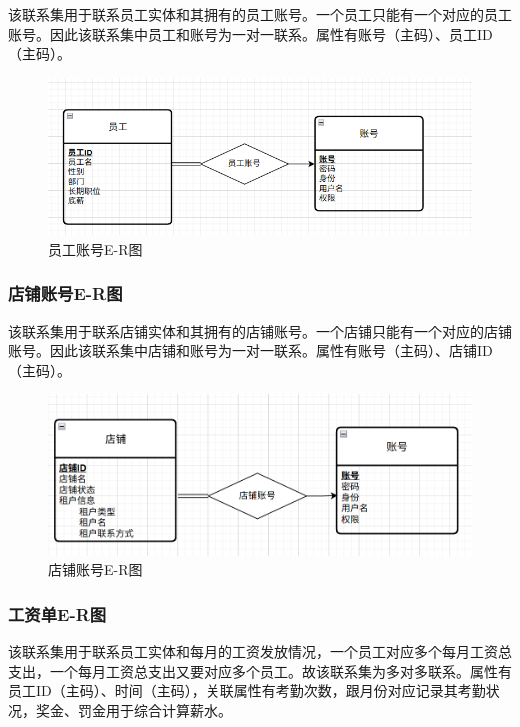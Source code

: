 \documentclass[]{article}
\let\oldincludegraphics\includegraphics
\renewcommand{\includegraphics}[2][]{%
  \begin{center}\oldincludegraphics[#1]{#2}\end{center}%
}
\begin{document}
该联系集用于联系员工实体和其拥有的员工账号。一个员工只能有一个对应的员工账号。因此该联系集中员工和账号为一对一联系。属性有账号（主码）、员工ID（主码）。

\begin{figure}[htbp]
\centering
\includegraphics{image10.png}
\caption{员工账号E-R图}
\end{figure}

\hypertarget{ux5e97ux94faux8d26ux53f7e-rux56fe}{%
\subsubsection{店铺账号E-R图}\label{ux5e97ux94faux8d26ux53f7e-rux56fe}}

该联系集用于联系店铺实体和其拥有的店铺账号。一个店铺只能有一个对应的店铺账号。因此该联系集中店铺和账号为一对一联系。属性有账号（主码）、店铺ID（主码）。

\begin{figure}[htbp]
\centering
\includegraphics{image11.png}
\caption{店铺账号E-R图}
\end{figure}

\hypertarget{ux5de5ux8d44ux5355e-rux56fe}{%
\subsubsection{工资单E-R图}\label{ux5de5ux8d44ux5355e-rux56fe}}

该联系集用于联系员工实体和每月的工资发放情况，一个员工对应多个每月工资总支出，一个每月工资总支出又要对应多个员工。故该联系集为多对多联系。属性有员工ID（主码）、时间（主码），关联属性有考勤次数，跟月份对应记录其考勤状况，奖金、罚金用于综合计算薪水。
\end{document}
